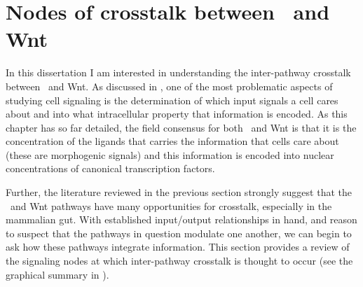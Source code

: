 \section{Nodes of crosstalk between \tgfbsf\ and Wnt}
\label{pathways:wntTgfb:mechanism}


In this dissertation I am interested in understanding the inter-pathway
crosstalk between \tgfbsf\ and Wnt. As discussed in ,
one of the most problematic aspects of studying cell signaling
is the determination of which input signals a cell cares about
and into what intracellular property that information is encoded.
As this chapter has so far detailed, the field consensus for both
\tgfbsf\ and Wnt is that it is the concentration of the ligands
that carries the information that cells care about
(these are morphogenic signals) and this
information is encoded into nuclear concentrations of canonical
transcription factors.


Further, the literature reviewed in the previous section
strongly suggest that the \tgfbsf\ and Wnt
pathways have many opportunities for crosstalk, especially in the
mammalian gut. With established input/output relationships
in hand, and reason to suspect that the pathways in question modulate one
another, we can begin to ask how these pathways integrate information.
This section provides a review of the signaling nodes at which
inter-pathway crosstalk is thought to occur (see the graphical
summary in ).




